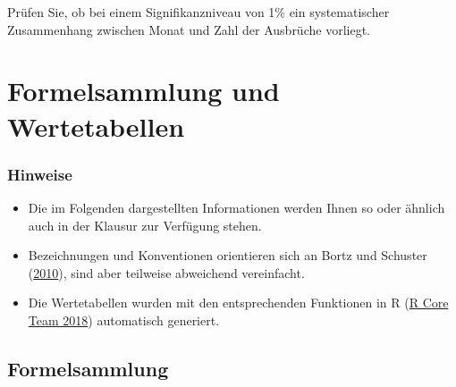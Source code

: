 \documentclass[
  11pt,
  ngerman,
  a4paper,
]{report}
\providecommand{\tightlist}{%
  \setlength{\itemsep}{0pt}\setlength{\parskip}{0pt}}
\begin{document}
Prüfen Sie, ob bei einem Signifikanzniveau von 1\% ein systematischer Zusammenhang zwischen Monat und Zahl der Ausbrüche vorliegt.

\hypertarget{formeln}{%
\chapter*{Formelsammlung und Wertetabellen}\label{formeln}}

\hypertarget{hinweise}{%
\subsection*{Hinweise}\label{hinweise}}

\begin{itemize}
\tightlist
\item
  Die im Folgenden dargestellten Informationen werden Ihnen so oder ähnlich auch in der Klausur zur Verfügung stehen.
\item
  Bezeichnungen und Konventionen orientieren sich an Bortz und Schuster (\protect\hyperlink{ref-bortz}{2010}), sind aber teilweise abweichend vereinfacht.
\item
  Die Wertetabellen wurden mit den entsprechenden Funktionen in R (\protect\hyperlink{ref-r}{R Core Team 2018}) automatisch generiert.
\end{itemize}

\pagebreak

\hypertarget{formelsammlung}{%
\section*{Formelsammlung}\label{formelsammlung}}
\end{document}
